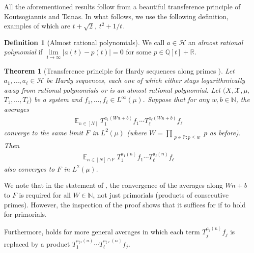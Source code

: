 \documentclass[11pt]{amsart}
\newtheorem{theorem}[lemma]{Theorem}
\theoremstyle{definition}
\newtheorem{definition}[lemma]{Definition}
\DeclareMathOperator*{\E}{\mathbb{E}}
\newcommand{\N}{{\mathbb N}}
\renewcommand{\P}{{\mathbb P}}
\newcommand{\Q}{{\mathbb Q}}
\newcommand{\R}{{\mathbb R}}
\newcommand{\CH}{{\mathcal H}}
\newcommand{\CX}{{\mathcal X}}
\newcommand{\1}{{\mathbf{1}}}
\begin{document}
    All the aforementioned results follow from a beautiful transference principle of Koutsogiannis and Tsinas. In what follows, we use the following definition, examples of which are $t + \sqrt{2},\; t^2 + 1/t$.
    \begin{definition}[Almost rational polynomials]\label{D: almost rational poly}
        We call $a\in\CH$ an \emph{almost rational polynomial} if $\lim\limits_{t\to\infty}|a(t) - p(t)| = 0$ for some $p\in\Q[t]+\R$.
    \end{definition}
    \begin{theorem}[Transference principle for Hardy sequences along primes {\cite[Theorem 1.2]{KoTs23}}]\label{T: KoTs transference}
        Let $a_1, \ldots, a_\ell\in \CH$ be Hardy sequences, each one of which either stays logarithmically away from rational polynomials or is an almost rational polynomial.
        Let $(X, \CX, \mu,$\! $T_1, \ldots, T_\ell)$ be a system and $f_1, \ldots, f_\ell\in L^\infty(\mu)$. Suppose that for any $w,b\in\N$, the averages
        \begin{align*}
            \E_{n\in[N]} T_1^{a_1(Wn+b)}f_1\cdots T_\ell^{a_\ell(Wn+b)}f_\ell
        \end{align*}
        converge to the same limit $F$ in $L^2(\mu)$ (where $W =\prod\limits_{\substack{p\in\P\colon p\leq w}}p$ as before). Then 
        \begin{align*}
            \E_{n\in[N]\cap\P} T_1^{a_1(n)}f_1\cdots T_\ell^{a_\ell(n)}f_\ell
        \end{align*}
        also converges to $F$ in $L^2(\mu)$.
    \end{theorem}
    We note that in the statement of \cite[Theorem 1.2]{KoTs23}, the convergence of the averages along $Wn+b$ to $F$ is required for all $W\in\N$, not just primorials (products of consecutive primes). However, the inspection of the proof shows that it suffices for if to hold for primorials.

    Furthermore, \cite[Theorem 1.2]{KoTs23} holds for more general averages in which each term $T_j^{a_j(n)}f_j$ is replaced by a product $T_1^{a_{j1}(n)}\cdots T_\ell^{a_{j\ell}(n)}f_j$.  
    
\end{document}
